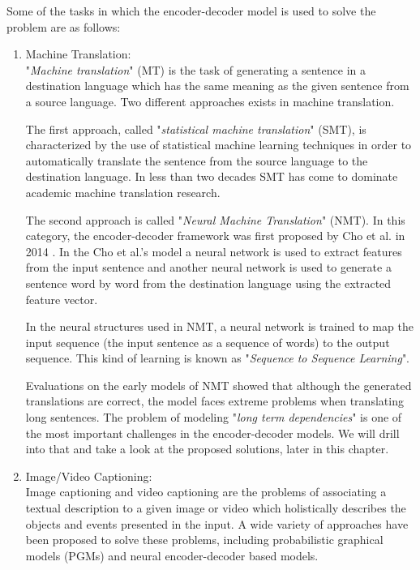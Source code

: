 \documentclass[preprint, 12pt]{elsarticle}
\begin{document}
Some of the tasks in which the encoder-decoder model is used to solve the problem are as follows:
	\begin{enumerate}
		\item Machine Translation:\\
		"\textit{Machine translation}" (MT) is the task of generating a sentence in a destination language which has the same meaning as the given sentence from a source language. Two different approaches exists in machine translation. 
		
		The first approach, called "\textit{statistical machine translation}" (SMT), is characterized by the use of statistical machine learning techniques in order to automatically translate the sentence from the source language to the destination language. In less than two decades SMT has come to dominate academic machine translation research\cite{lopez2008statistical}. 
		
		The second approach is called "\textit{Neural Machine Translation}" (NMT). In this category, the encoder-decoder framework was first proposed by Cho et al. in 2014 \cite{cho2014learning}. In the Cho et al.'s model a neural network is used to extract features from the input sentence and another neural network is used to generate a sentence word by word from the destination language using the extracted feature vector. 
		
		In the neural structures used in NMT, a neural network is trained to map the input sequence (the input sentence as a sequence of words) to the output sequence. This kind of learning is known as "\textit{Sequence to Sequence Learning}".
		
		Evaluations on the early models of NMT showed that although the generated translations are correct, the model faces extreme problems when translating long sentences\cite{cho2014properties}. The problem of modeling "\textit{long term dependencies}" is one of the most important challenges in the encoder-decoder models. We will drill into that and take a look at the proposed solutions, later in this chapter.
		
		\item Image/Video Captioning:\\
		Image captioning and video captioning are the problems of associating a textual description to a given image or video which holistically describes the objects and events presented in the input. A wide variety of approaches have been proposed to solve these problems, including probabilistic graphical models (PGMs) and neural encoder-decoder based models.
		

\end{enumerate}
\end{document}

